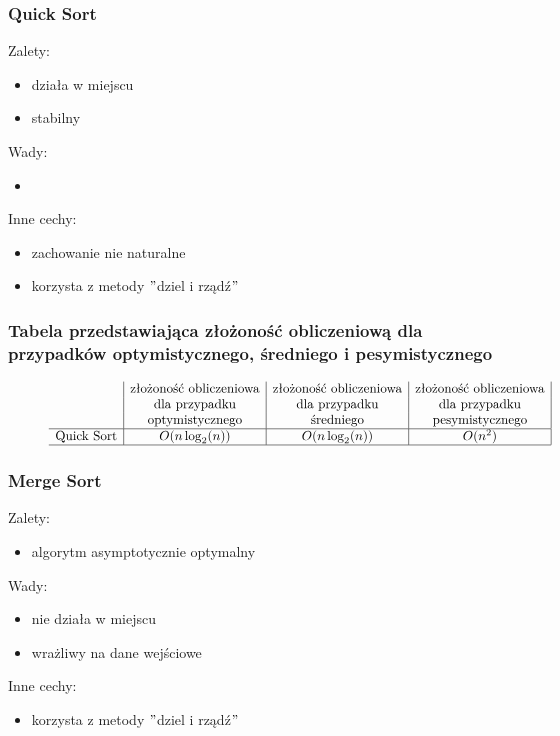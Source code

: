 \documentclass[polish,polish,a4paper]{article}
\begin{document}
\begin{spacing}{1.5}
		\subsubsection*{Quick Sort}
	Zalety:
	\begin{itemize}
		\item działa w miejscu
		\item stabilny 
	\end{itemize}
	Wady:
	\begin{itemize}
		\item 
	\end{itemize}
	Inne cechy:
	\begin{itemize}
		\item zachowanie nie naturalne
		\item korzysta z metody $"$dziel i rządź$"$
	\end{itemize}
	
	\subsubsection*{Tabela przedstawiająca złożoność obliczeniową dla przypadków optymistycznego, średniego i pesymistycznego} 
	\begin{figure}[H]
		
		\begin{equation*}
		\begin{array}{l|c|c|c|}

		&$złożoność obliczeniowa$&$złożoność obliczeniowa$&$złożoność obliczeniowa$\\
		&$dla przypadku$&$dla przypadku$&$dla przypadku$\\
		&$optymistycznego$&$średniego$&$pesymistycznego$\\
		\hline
		$Quick Sort$&O(n\log_{2}(n))&O(n\log_{2}(n))&O(n^2)\\
		\hline
		\end{array}
		\end{equation*}
	\end{figure}
	
			\subsubsection*{Merge Sort}
	Zalety:
	\begin{itemize}
		\item algorytm asymptotycznie optymalny
	\end{itemize}
	Wady:
	\begin{itemize}
		\item nie działa w miejscu
		\item wrażliwy na dane wejściowe
	\end{itemize}
	Inne cechy:
	\begin{itemize}
		\item korzysta z metody $"$dziel i rządź$"$
	\end{itemize}
	

\end{spacing}
\end{document}
